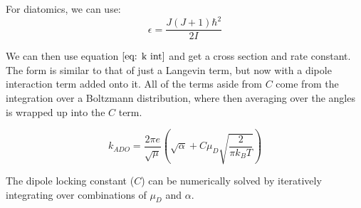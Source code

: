 For diatomics, we can use:
\begin{equation*}
    \epsilon = \frac{J(J+1)\hbar^2}{2I}
\end{equation*}

We can then use equation $\ref{eq: k int}$ and get a cross section and rate constant. The form is similar to that of just a Langevin term, but now with a dipole interaction term added onto it. All of the terms aside from $C$ come from the integration over a Boltzmann distribution, where then averaging over the angles is wrapped up into the $C$ term.

\begin{equation}
    k_{ADO} = \frac{2 \pi e}{\sqrt{\mu}}\left(\sqrt{\alpha}+C \mu_D\sqrt{\frac{2}{\pi k_B T}}\right)
\end{equation}

The dipole locking constant ($C$) can be numerically solved by iteratively integrating over combinations of $\mu_D$ and $\alpha$.\cite{Su1973}\cite{Troe1985}

